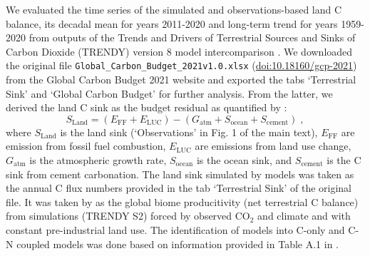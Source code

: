 \documentclass{myreport}
\begin{document}
We evaluated the time series of the simulated and observations-based land C balance, its decadal mean for years 2011-2020 and long-term trend for years 1959-2020 from outputs of the Trends and Drivers of Terrestrial Sources and Sinks of Carbon Dioxide (TRENDY) version 8 model intercomparison \citep{sitch_trends_2024}. We downloaded the original file \texttt{Global\_Carbon\_Budget\_2021v1.0.xlsx} (\url{doi:10.18160/gcp-2021}) from the Global Carbon Budget 2021 website and exported the tabs `Terrestrial Sink' and `Global Carbon Budget' for further analysis. From the latter, we derived the land C sink as the budget residual as quantified by \citep{friedlingstein22essd}:
\begin{equation}
S_\text{Land} = (E_\text{FF} + E_\text{LUC}) - (G_\text{atm} + S_\text{ocean} + S_\text{cement}) \;,
\end{equation}
where $S_\text{Land}$ is the land sink (`Observations' in Fig. 1 of the main text), $E_\text{FF}$ are emission from fossil fuel combustion, $E_\text{LUC}$ are emissions from land use change, $G_\text{atm}$ is the atmospheric growth rate, $S_\text{ocean}$ is the ocean sink, and $S_\text{cement}$ is the C sink from cement carbonation. The land sink simulated by models was taken as the annual C flux numbers provided in the tab `Terrestrial Sink' of the original file. It was taken by \citep{friedlingstein22essd} as the global biome producitivity (net terrestrial C balance) from simulations (TRENDY S2) forced by observed CO$_2$ and climate and with constant pre-industrial land use. The identification of models into C-only and C-N coupled models was done based on information provided in Table A.1 in \citep{friedlingstein22essd}. 

\clearpage

\end{document}
